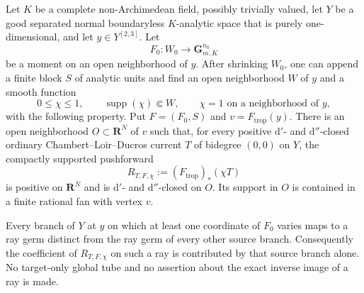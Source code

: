 
\begin{lemma}
\label{lem:p213-variation-graph-source-cutoff}
Let $K$ be a complete non-Archimedean field, possibly trivially valued,
let $Y$ be a good separated normal boundaryless $K$-analytic space that is
purely one-dimensional, and let $y\in Y^{[2,3]}$.  Let
\[
                  F_0:W_0\longrightarrow\mathbf G_{m,K}^{n_0}
\]
be a moment on an open neighborhood of $y$.  After shrinking $W_0$, one
can append a finite block $S$ of analytic units and find an open
neighborhood $W$ of $y$ and a smooth function
\[
       0\leq\chi\leq1,\qquad
       \operatorname{supp}(\chi)\Subset W,\qquad
       \chi=1\text{ on a neighborhood of }y,
\]
with the following property.  Put $F=(F_0,S)$ and
$v=F_{\mathrm{trop}}(y)$.  There is an open neighborhood
$O\subset\mathbf R^N$ of $v$ such that, for every positive
$\mathrm d'$- and $\mathrm d''$-closed ordinary Chambert--Loir--Ducros
current $T$ of bidegree $(0,0)$ on $Y$, the compactly supported
pushforward
\begin{equation}
             R_{T,F,\chi}:=(F_{\mathrm{trop}})_*(\chi T)
\label{eq:p213-source-cutoff-pushforward}
\end{equation}
is positive on $\mathbf R^N$ and is $\mathrm d'$- and
$\mathrm d''$-closed on $O$.  Its support in $O$ is contained in a finite
rational fan with vertex $v$.

Every branch of $Y$ at $y$ on which at least one coordinate of $F_0$
varies maps to a ray germ distinct from the ray germ of every other
source branch.  Consequently the coefficient of
$R_{T,F,\chi}$ on such a ray is contributed by that source branch alone.
No target-only global tube and no assertion about the exact inverse image
of a ray is made.
\end{lemma}

